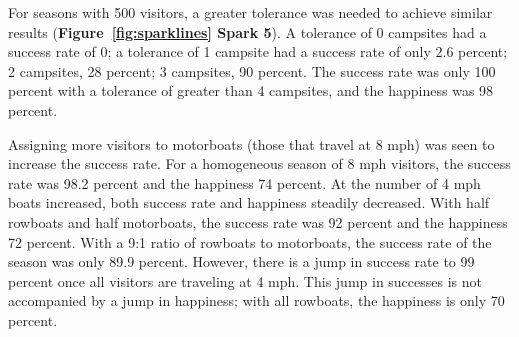 \documentclass[11pt]{article} %
\begin{document}
For seasons with 500 visitors, a greater tolerance was needed to achieve
similar results (\textbf{Figure~\ref{fig:sparklines} Spark 5}).
A tolerance of 0 campsites
had a success rate of 0; a tolerance of 1 campsite had a success rate of
only 2.6 percent; 2 campsites, 28 percent; 3 campsites, 90 percent. The
success rate was only 100 percent with a tolerance of greater than 4 campsites,
and the happiness was 98 percent.

Assigning more visitors to motorboats (those that travel at 8 mph) was seen
to increase the success rate. For a homogeneous season of 8 mph visitors, the
success rate was 98.2 percent and the happiness 74 percent. At the number
of 4 mph boats increased, both success rate and happiness steadily decreased.
With half rowboats and half motorboats, the success rate was 92 percent and
the happiness 72 percent. With a 9:1 ratio of rowboats to motorboats, the
success rate of the season was only 89.9 percent. However, there is a jump
in success rate to 99 percent once all visitors are traveling at 4 mph. This
jump in successes is not accompanied by a jump in happiness; with all
rowboats, the happiness is only 70 percent.
\end{document}
